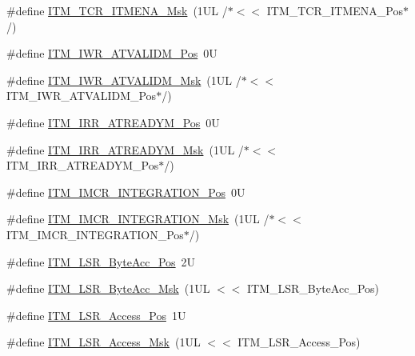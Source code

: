 \begin{DoxyCompactItemize}
\item 
\#define \hyperlink{group___c_m_s_i_s___i_t_m_ga7dd53e3bff24ac09d94e61cb595cb2d9}{I\+T\+M\+\_\+\+T\+C\+R\+\_\+\+I\+T\+M\+E\+N\+A\+\_\+\+Msk}~(1\+U\+L /$\ast$$<$$<$ I\+T\+M\+\_\+\+T\+C\+R\+\_\+\+I\+T\+M\+E\+N\+A\+\_\+\+Pos$\ast$/)
\item 
\#define \hyperlink{group___c_m_s_i_s___i_t_m_ga04d3f842ad48f6a9127b4cecc963e1d7}{I\+T\+M\+\_\+\+I\+W\+R\+\_\+\+A\+T\+V\+A\+L\+I\+D\+M\+\_\+\+Pos}~0U
\item 
\#define \hyperlink{group___c_m_s_i_s___i_t_m_ga67b969f8f04ed15886727788f0e2ffd7}{I\+T\+M\+\_\+\+I\+W\+R\+\_\+\+A\+T\+V\+A\+L\+I\+D\+M\+\_\+\+Msk}~(1\+U\+L /$\ast$$<$$<$ I\+T\+M\+\_\+\+I\+W\+R\+\_\+\+A\+T\+V\+A\+L\+I\+D\+M\+\_\+\+Pos$\ast$/)
\item 
\#define \hyperlink{group___c_m_s_i_s___i_t_m_ga259edfd1d2e877a62e06d7a240df97f4}{I\+T\+M\+\_\+\+I\+R\+R\+\_\+\+A\+T\+R\+E\+A\+D\+Y\+M\+\_\+\+Pos}~0U
\item 
\#define \hyperlink{group___c_m_s_i_s___i_t_m_ga3dbc3e15f5bde2669cd8121a1fe419b9}{I\+T\+M\+\_\+\+I\+R\+R\+\_\+\+A\+T\+R\+E\+A\+D\+Y\+M\+\_\+\+Msk}~(1\+U\+L /$\ast$$<$$<$ I\+T\+M\+\_\+\+I\+R\+R\+\_\+\+A\+T\+R\+E\+A\+D\+Y\+M\+\_\+\+Pos$\ast$/)
\item 
\#define \hyperlink{group___c_m_s_i_s___i_t_m_ga08de02bf32caf48aaa29f7c68ff5d755}{I\+T\+M\+\_\+\+I\+M\+C\+R\+\_\+\+I\+N\+T\+E\+G\+R\+A\+T\+I\+O\+N\+\_\+\+Pos}~0U
\item 
\#define \hyperlink{group___c_m_s_i_s___i_t_m_ga8838bd3dd04c1a6be97cd946364a3fd2}{I\+T\+M\+\_\+\+I\+M\+C\+R\+\_\+\+I\+N\+T\+E\+G\+R\+A\+T\+I\+O\+N\+\_\+\+Msk}~(1\+U\+L /$\ast$$<$$<$ I\+T\+M\+\_\+\+I\+M\+C\+R\+\_\+\+I\+N\+T\+E\+G\+R\+A\+T\+I\+O\+N\+\_\+\+Pos$\ast$/)
\item 
\#define \hyperlink{group___c_m_s_i_s___i_t_m_gabfae3e570edc8759597311ed6dfb478e}{I\+T\+M\+\_\+\+L\+S\+R\+\_\+\+Byte\+Acc\+\_\+\+Pos}~2U
\item 
\#define \hyperlink{group___c_m_s_i_s___i_t_m_ga91f492b2891bb8b7eac5b58de7b220f4}{I\+T\+M\+\_\+\+L\+S\+R\+\_\+\+Byte\+Acc\+\_\+\+Msk}~(1\+U\+L $<$$<$ I\+T\+M\+\_\+\+L\+S\+R\+\_\+\+Byte\+Acc\+\_\+\+Pos)
\item 
\#define \hyperlink{group___c_m_s_i_s___i_t_m_ga144a49e12b83ad9809fdd2769094fdc0}{I\+T\+M\+\_\+\+L\+S\+R\+\_\+\+Access\+\_\+\+Pos}~1U
\item 
\#define \hyperlink{group___c_m_s_i_s___i_t_m_gac8ae69f11c0311da226c0c8ec40b3d37}{I\+T\+M\+\_\+\+L\+S\+R\+\_\+\+Access\+\_\+\+Msk}~(1\+U\+L $<$$<$ I\+T\+M\+\_\+\+L\+S\+R\+\_\+\+Access\+\_\+\+Pos)

\end{DoxyCompactItemize}
